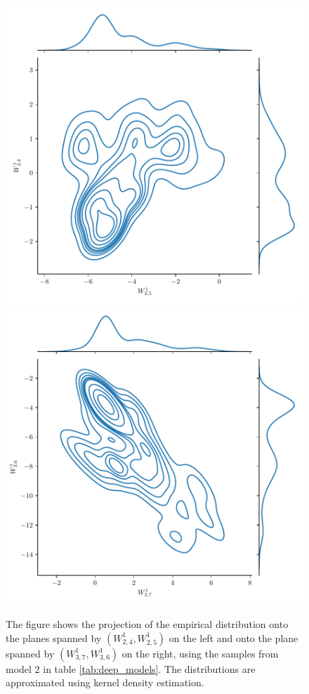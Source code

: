 \begin{figure}
    \centering
    \includegraphics[scale=0.5]{figures/posterior_distribution/posterior_weights1.pdf}
    \includegraphics[scale=0.5]{figures/posterior_distribution/posterior_weights2.pdf}
    \caption{The figure shows the projection of the empirical distribution onto the planes spanned by $(W_{2,4}^1, W_{2,5}^1)$ on the left and onto the plane spanned by $(W_{3,7}^1, W_{3, 6}^1)$ on the right, using the samples from model 2 in table \ref{tab:deep_models}. The distributions are approximated using kernel density estimation. 
    }
    \label{fig:standardized_residual}
\end{figure}


